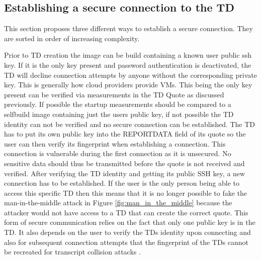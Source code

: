 \subsection{Establishing a secure connection to the TD}

This section proposes three different ways to establish a secure connection. They are sorted in order of increasing complexity.

\label{Establishing_a_secure_connection}


\label{SSHConnection}
Prior to TD creation the image can be build containing a known user public ssh key. If it is the only key present and password authentication is deactivated, the TD will decline connection attempts by anyone without the corresponding private key. This is generally how cloud providers provide VMs. This being the only key present can be verified via measurements in the TD Quote as discussed previously. If possible the startup measurements should be compared to a selfbuild image containing just the users public key, if not possible the TD identity can not be verified and no secure connection can be established. The TD has to put its own public key into the REPORTDATA field of its quote so the user can then verify its fingerprint when establishing a connection. This connection is vulnerable during the first connection as it is unsecured. No sensitive data should thus be transmitted before the quote is not received and verified. After verifying the TD identity and getting its public SSH key, a new connection has to be established. If the user is the only person being able to access this specific TD then this means that it is no longer possible to fake the man-in-the-middle attack in Figure \ref{fig:man_in_the_middle} because the attacker would not have access to a TD that can create the correct quote. This form of secure communication relies on the fact that only one public key is in the TD. It also depends on the user to verify the TDs identity upon connecting and also for subsequent connection attempts that the fingerprint of the TDs cannot be recreated for transcript collision attacks \cite{bhargavan_transcript_2016}.


